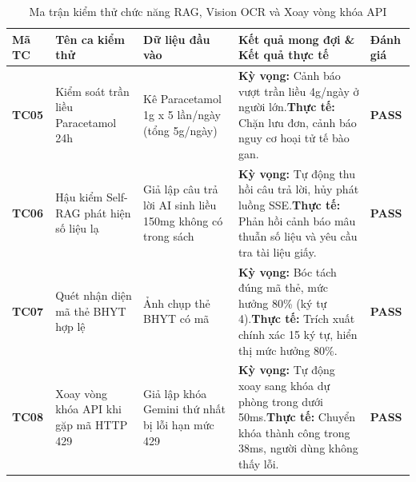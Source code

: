 \begin{table}[htbp]
\centering
\small
\begin{tabularx}{\textwidth}{C{1.2cm} L{3.5cm} L{3.5cm} Y C{1.5cm}}
\toprule
\textbf{Mã TC} & \textbf{Tên ca kiểm thử} & \textbf{Dữ liệu đầu vào} & \textbf{Kết quả mong đợi \& Kết quả thực tế} & \textbf{Đánh giá} \\
\midrule
\textbf{TC05} & Kiểm soát trần liều Paracetamol 24h & Kê Paracetamol 1g x 5 lần/ngày (tổng 5g/ngày) & \textbf{Kỳ vọng:} Cảnh báo vượt trần liều 4g/ngày ở người lớn.\newline \textbf{Thực tế:} Chặn lưu đơn, cảnh báo nguy cơ hoại tử tế bào gan. & \textbf{PASS} \\
\addlinespace
\textbf{TC06} & Hậu kiểm Self-RAG phát hiện số liệu lạ & Giả lập câu trả lời AI sinh liều 150mg không có trong sách & \textbf{Kỳ vọng:} Tự động thu hồi câu trả lời, hủy phát luồng SSE.\newline \textbf{Thực tế:} Phản hồi cảnh báo mâu thuẫn số liệu và yêu cầu tra tài liệu giấy. & \textbf{PASS} \\
\addlinespace
\textbf{TC07} & Quét nhận diện mã thẻ BHYT hợp lệ & Ảnh chụp thẻ BHYT có mã  & \textbf{Kỳ vọng:} Bóc tách đúng mã thẻ, mức hưởng 80\% (ký tự 4).\newline \textbf{Thực tế:} Trích xuất chính xác 15 ký tự, hiển thị mức hưởng 80\%. & \textbf{PASS} \\
\addlinespace
\textbf{TC08} & Xoay vòng khóa API khi gặp mã HTTP 429 & Giả lập khóa Gemini thứ nhất bị lỗi hạn mức 429 & \textbf{Kỳ vọng:} Tự động xoay sang khóa dự phòng trong dưới 50ms.\newline \textbf{Thực tế:} Chuyển khóa thành công trong 38ms, người dùng không thấy lỗi. & \textbf{PASS} \\
\bottomrule
\end{tabularx}
\caption{Ma trận kiểm thử chức năng RAG, Vision OCR và Xoay vòng khóa API}
\end{table}

